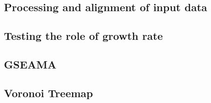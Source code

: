 \subsection{Processing and alignment of input data}




\subsection{Testing the role of growth rate}



\subsection{GSEAMA}



\subsection{Voronoi Treemap}


